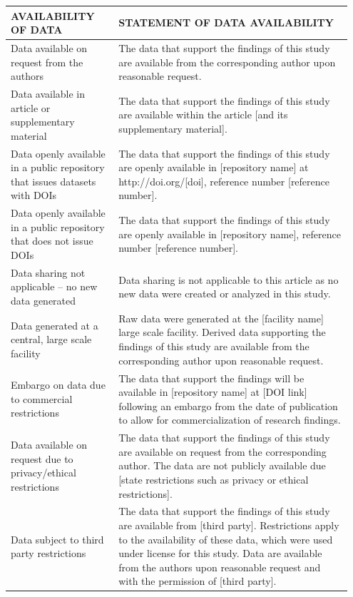 \documentclass[%
 aip,
 amsmath,amssymb,
preprint,%
]{revtex4-1}
\begin{document}
\begin{center}
\renewcommand\arraystretch{1.2}
\begin{tabular}{| >{\raggedright\arraybackslash}p{0.3\linewidth} | >{\raggedright\arraybackslash}p{0.65\linewidth} |}
\hline
\textbf{AVAILABILITY OF DATA} & \textbf{STATEMENT OF DATA AVAILABILITY}\\  
\hline
Data available on request from the authors
&
The data that support the findings of this study are available from the corresponding author upon reasonable request.
\\\hline
Data available in article or supplementary material
&
The data that support the findings of this study are available within the article [and its supplementary material].
\\\hline
Data openly available in a public repository that issues datasets with DOIs
&
The data that support the findings of this study are openly available in [repository name] at http://doi.org/[doi], reference number [reference number].
\\\hline
Data openly available in a public repository that does not issue DOIs
&
The data that support the findings of this study are openly available in [repository name], reference number [reference number].
\\\hline
Data sharing not applicable – no new data generated
&
Data sharing is not applicable to this article as no new data were created or analyzed in this study.
\\\hline
Data generated at a central, large scale facility
&
Raw data were generated at the [facility name] large scale facility. Derived data supporting the findings of this study are available from the corresponding author upon reasonable request.
\\\hline
Embargo on data due to commercial restrictions
&
The data that support the findings will be available in [repository name] at [DOI link] following an embargo from the date of publication to allow for commercialization of research findings.
\\\hline
Data available on request due to privacy/ethical restrictions
&
The data that support the findings of this study are available on request from the corresponding author. The data are not publicly available due [state restrictions such as privacy or ethical restrictions].
\\\hline
Data subject to third party restrictions
&
The data that support the findings of this study are available from [third party]. Restrictions apply to the availability of these data, which were used under license for this study. Data are available from the authors upon reasonable request and with the permission of [third party].
\\\hline
\end{tabular}
\end{center}
\end{document}
